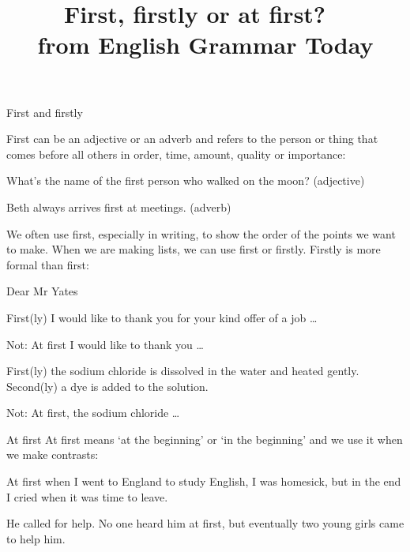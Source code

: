 \documentclass{article}
\title{First, firstly or at first? ~\\ from English Grammar Today }
\begin{document}
\maketitle

First and firstly


First can be an adjective or an adverb and refers to the person or thing that comes before all others in order, time, amount, quality or importance:

What’s the name of the first person who walked on the moon? (adjective)

Beth always arrives first at meetings. (adverb)

We often use first, especially in writing, to show the order of the points we want to make. When we are making lists, we can use first or firstly. Firstly is more formal than first:

Dear Mr Yates

First(ly) I would like to thank you for your kind offer of a job …

Not: At first I would like to thank you …

First(ly) the sodium chloride is dissolved in the water and heated gently. Second(ly) a dye is added to the solution.

Not: At first, the sodium chloride …

At first
At first means ‘at the beginning’ or ‘in the beginning’ and we use it when we make contrasts:

At first when I went to England to study English, I was homesick, but in the end I cried when it was time to leave.

He called for help. No one heard him at first, but eventually two young girls came to help him.
\end{document}
